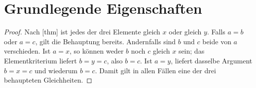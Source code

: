 \documentclass[main.tex]{subfiles}
\begin{document}

\section{Grundlegende Eigenschaften}

\begin{proof}
Nach [thm]
ist jedes der drei Elemente gleich \(x\) oder gleich \(y\).
Falls \(a=b\) oder \(a=c\), gilt die Behauptung bereits.
Andernfalls sind \(b\) und \(c\) beide von \(a\) verschieden.
Ist \(a=x\), so können weder \(b\) noch \(c\) gleich \(x\) sein;
das Elementkriterium liefert \(b=y=c\), also \(b=c\).
Ist \(a=y\), liefert dasselbe Argument \(b=x=c\) und wiederum \(b=c\).
Damit gilt in allen Fällen eine der drei behaupteten Gleichheiten.
\end{proof}

\begin{tabproofwide}
    {}
    {}
    {}
\end{tabproofwide}

\begin{tabproof}
\end{tabproof}

\begin{tabproof}
\end{tabproof}
\end{document}
